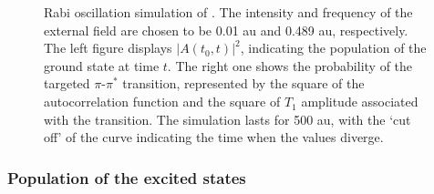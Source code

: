 \begin{figure}
\begin{subfigure}{0.45\textwidth}
      \end{subfigure}
     \caption{Rabi oscillation simulation of . The intensity and frequency of the external field are chosen to be 0.01 au and 0.489 au, respectively. The left figure displays $|A(t_{0}, t)|^{2}$, indicating the population of the ground state at time $t$. The right one shows the probability of the targeted $\pi$-$\pi^{*}$ transition, represented by the square of the autocorrelation function and the square of $\hat{T}_{1}$ amplitude associated with the transition. The simulation lasts for 500 au, with the `cut off' of the curve indicating the time when the values diverge.}
     \label{fig:c2h4-rabi}
\end{figure}

\subsubsection{Population of the excited states}\label{results-cc3-32}
\label{results-cc3-321}
